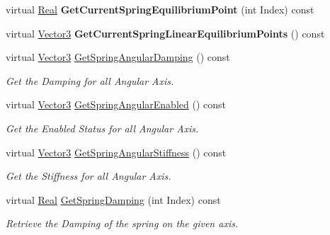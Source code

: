\begin{DoxyCompactItemize}
\item 
\hypertarget{classphys_1_1Generic6DofSpringConstraint_ad33276f69fc1768d430cd10c1b08b575}{
virtual \hyperlink{namespacephys_af7eb897198d265b8e868f45240230d5f}{Real} {\bfseries GetCurrentSpringEquilibriumPoint} (int Index) const }
\label{classphys_1_1Generic6DofSpringConstraint_ad33276f69fc1768d430cd10c1b08b575}

\item 
\hypertarget{classphys_1_1Generic6DofSpringConstraint_af4e520edbe0c5f40fac000adc5a8ad54}{
virtual \hyperlink{classphys_1_1Vector3}{Vector3} {\bfseries GetCurrentSpringLinearEquilibriumPoints} () const }
\label{classphys_1_1Generic6DofSpringConstraint_af4e520edbe0c5f40fac000adc5a8ad54}

\item 
virtual \hyperlink{classphys_1_1Vector3}{Vector3} \hyperlink{classphys_1_1Generic6DofSpringConstraint_a7b8a8733b7a8d25c0d84684a69624334}{GetSpringAngularDamping} () const 
\begin{DoxyCompactList}\small\item\em Get the Damping for all Angular Axis. \item\end{DoxyCompactList}\item 
virtual \hyperlink{classphys_1_1Vector3}{Vector3} \hyperlink{classphys_1_1Generic6DofSpringConstraint_a3aac6b13a8127ba82354f436c624c879}{GetSpringAngularEnabled} () const 
\begin{DoxyCompactList}\small\item\em Get the Enabled Status for all Angular Axis. \item\end{DoxyCompactList}\item 
virtual \hyperlink{classphys_1_1Vector3}{Vector3} \hyperlink{classphys_1_1Generic6DofSpringConstraint_a8e51c0141b190a4c34365abc9dc11a98}{GetSpringAngularStiffness} () const 
\begin{DoxyCompactList}\small\item\em Get the Stiffness for all Angular Axis. \item\end{DoxyCompactList}\item 
virtual \hyperlink{namespacephys_af7eb897198d265b8e868f45240230d5f}{Real} \hyperlink{classphys_1_1Generic6DofSpringConstraint_a662d116e3467851e9d6bba6b01d3382a}{GetSpringDamping} (int Index) const 
\begin{DoxyCompactList}\small\item\em Retrieve the Damping of the spring on the given axis. \item\end{DoxyCompactList}\item 

\end{DoxyCompactItemize}
